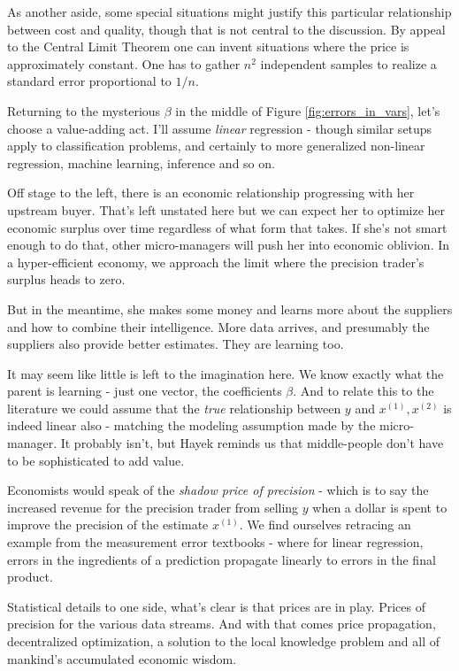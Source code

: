 As another aside, some special situations might justify this particular relationship between cost and quality, though that is not central to the discussion. By appeal to the Central Limit Theorem one can invent situations where the price is approximately constant. One has to gather $n^2$ independent samples to realize a standard error proportional to $1/n$. 


Returning to the mysterious $\beta$ in the middle of Figure \ref{fig:errors_in_vars}, let's choose a value-adding act. I'll assume {\em linear} regression - though similar setups apply to classification problems, and certainly to more generalized non-linear regression, machine learning, inference and so on.  


Off stage to the left, there is an economic relationship progressing with her upstream buyer. That's left unstated here but we can expect her to optimize her economic surplus over time regardless of what form that takes. If she's not smart enough to do that, other micro-managers will push her into economic oblivion. In a hyper-efficient economy, we approach the limit where the precision trader's surplus heads to zero.

But in the meantime, she makes some money and learns more about the suppliers and how to combine their intelligence. More data arrives, and presumably the suppliers also provide better estimates. They are learning too. 


It may seem like little is left to the imagination here. We know exactly what the parent is learning - just one vector, the coefficients $\beta$. And to relate this to the literature we could assume that the {\em true} relationship between $y$ and $x^{(1)}, x^{(2)}$ is indeed linear also - matching the modeling assumption made by the micro-manager. It probably isn't, but Hayek reminds us that middle-people don't have to be sophisticated to add value. 


Economists would speak of the {\em shadow price of precision} - which is to say the increased revenue for the precision trader from selling $y$ when a dollar is spent to improve the precision of the estimate $x^{(1)}$.  We find ourselves retracing an example from the measurement error textbooks - where for linear regression, errors in the ingredients of a prediction propagate linearly to errors in the final product. 

Statistical details to one side, what's clear is that prices are in play. Prices of precision for the various data streams. And with that comes price propagation, decentralized optimization, a solution to the local knowledge problem and all of mankind's accumulated economic wisdom. 

